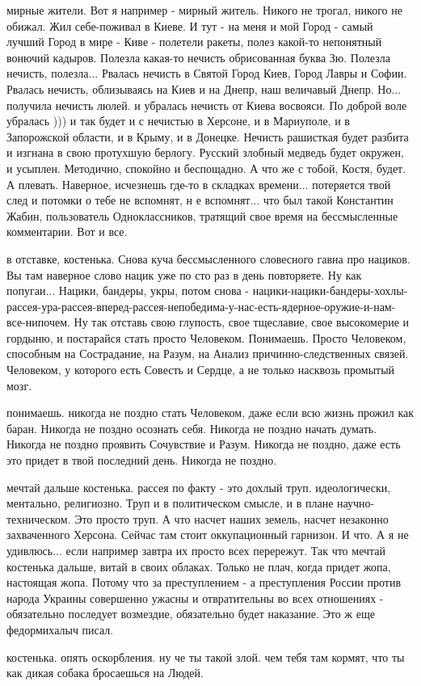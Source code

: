 мирные жители. Вот я например - мирный житель. Никого не трогал, никого не
обижал. Жил себе-поживал в Киеве. И тут - на меня и мой Город - самый лучший
Город в мире - Киве - полетели ракеты, полез какой-то непонятный вонючий
кадыров. Полезла какая-то нечисть обрисованная буква Зю. Полезла нечисть,
полезла... Рвалась нечисть в Святой Город Киев, Город Лавры и Софии. Рвалась
нечисть, облизываясь на Киев и на Днепр, наш величавый Днепр. Но... получила
нечисть люлей. и убралась нечисть от Киева восвояси. По доброй воле убралась
))) и так будет и с нечистью в Херсоне, и в Мариуполе, и в Запорожской области,
и в Крыму, и в Донецке. Нечисть рашисткая будет разбита и изгнана в свою
протухшую берлогу. Русский злобный медведь будет окружен, и усыплен. Методично,
спокойно и беспощадно. А что же с тобой, Костя, будет. А плевать. Наверное,
исчезнешь где-то в складках времени... потеряется твой след и потомки о тебе не
вспомнят, н е вспомнят... что был такой Константин Жабин, пользователь
Одноклассников, тратящий свое время на бессмысленные комментарии. Вот и все.

в отставке, костенька. Снова куча бессмысленного словесного гавна про нациков.
Вы там наверное слово нацик уже по сто раз в день повторяете. Ну как попугаи...
Нацики, бандеры, укры, потом снова -
нацики-нацики-бандеры-хохлы-рассея-ура-рассея-вперед-рассея-непобедима-у-нас-есть-ядерное-оружие-и-нам-все-нипочем.
Ну так отставь свою глупость, свое тщеславие, свое высокомерие и гордыню, и
постарайся стать просто Человеком. Понимаешь. Просто Человеком, способным на
Сострадание, на Разум, на Анализ причинно-следственных связей. Человеком, у
которого есть Совесть и Сердце, а не только насквозь промытый мозг.

понимаешь. никогда не поздно стать Человеком, даже если всю жизнь прожил как
баран. Никогда не поздно осознать себя. Никогда не поздно начать думать.
Никогда не поздно проявить Сочувствие и Разум. Никогда не поздно, даже есть это
придет в твой последний день. Никогда не поздно.

мечтай дальше костенька. рассея по факту - это дохлый труп. идеологически,
ментально, религиозно. Труп и в политическом смысле, и в плане
научно-техническом. Это просто труп. А что насчет наших земель, насчет
незаконно захваченного Херсона. Сейчас там стоит оккупационный гарнизон. И что.
А я не удивлюсь... если например завтра их просто всех перережут. Так что
мечтай костенька дальше, витай в своих облаках. Только не плач, когда придет
жопа, настоящая жопа. Потому что за преступлением - а преступления России
против народа Украины совершенно ужасны и отвратительны во всех отношениях -
обязательно последует возмездие, обязательно будет наказание. Это ж еще
федормихалыч писал.

костенька. опять оскорбления. ну че ты такой злой. чем тебя там кормят, что ты
как дикая собака бросаешься на Людей.
